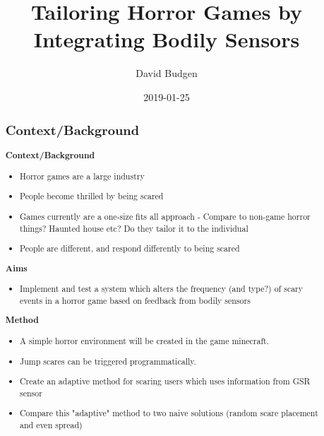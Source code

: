 \documentclass[12pt,a4paper]{article}
\title{Tailoring Horror Games by Integrating Bodily Sensors}
\author{David Budgen}
\date{2019-01-25}
\begin{document}
\maketitle

\begin{abstract}


\subsection{Context/Background}
	
\textbf{Context/Background}
	\begin{itemize}
		\item Horror games are a large industry
		\item People become thrilled by being scared
		\item Games currently are a one-size fits all approach - Compare to non-game horror things? Haunted house etc? Do they tailor it to the individual
		\item People are different, and respond differently to being scared
	\end{itemize}

\textbf{Aims}
	\begin{itemize}
		\item Implement and test a system which alters the frequency (and type?) of scary events in a horror game based on feedback from bodily sensors
	\end{itemize}

\textbf{Method}
	\begin{itemize}
		\item A simple horror environment will be created in the game minecraft.
		\item Jump scares can be triggered programmatically.
		\item Create an adaptive method for scaring users which uses information from GSR sensor
		\item Compare this "adaptive" method to two naive solutions (random scare placement and even spread)
	\end{itemize}


\end{abstract}
\end{document}
